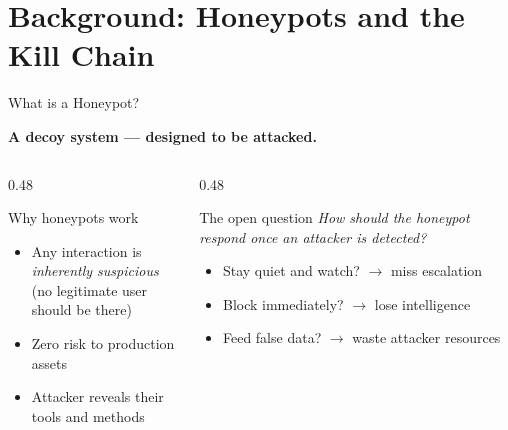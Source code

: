 \documentclass[aspectratio=169, 12pt]{beamer}
\begin{document}
\section{Background: Honeypots and the Kill Chain}

\begin{frame}{What is a Honeypot?}
  \begin{center}
    \Large\textbf{A decoy system --- designed to be attacked.}
  \end{center}
  \vspace{0.3cm}
  \begin{columns}[T]
    \begin{column}{0.48\textwidth}
      \begin{exampleblock}{Why honeypots work}
        \begin{itemize}
          \item Any interaction is \emph{inherently suspicious}\\
                (no legitimate user should be there)
          \item Zero risk to production assets
          \item Attacker reveals their tools and methods
        \end{itemize}
      \end{exampleblock}
    \end{column}
    \begin{column}{0.48\textwidth}
      \begin{alertblock}{The open question}
        \emph{How should the honeypot respond once an attacker is detected?}
        \begin{itemize}
          \item Stay quiet and watch? $\to$ miss escalation
          \item Block immediately? $\to$ lose intelligence
          \item Feed false data? $\to$ waste attacker resources
        \end{itemize}
      \end{alertblock}
    \end{column}
  \end{columns}
\end{frame}
\end{document}
